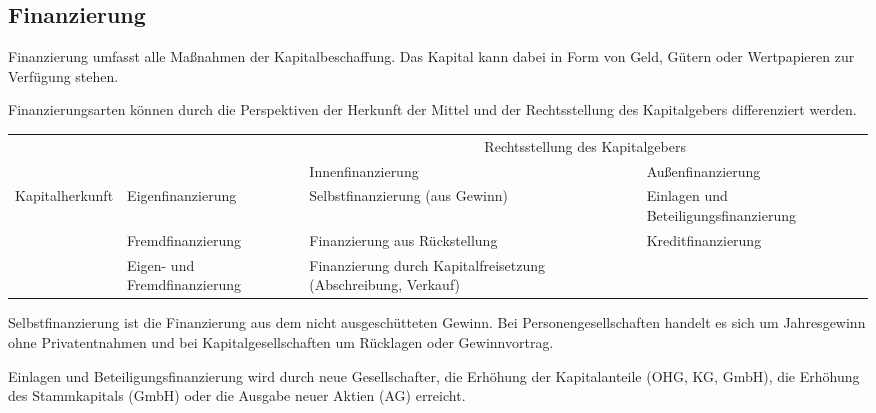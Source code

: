 \subsection{Finanzierung}

Finanzierung umfasst alle Maßnahmen der Kapitalbeschaffung. Das Kapital kann dabei in Form von Geld, Gütern oder Wertpapieren zur Verfügung stehen.

Finanzierungsarten können durch die Perspektiven der Herkunft der Mittel und der Rechtsstellung des Kapitalgebers differenziert werden.

\begin{table}
    [H]
    \centering
    \begin{tabularx}{\textwidth}{|l|X|X|X|}
        \cline{3-4}
        \multicolumn{2}{c|}{}            & \multicolumn{2}{c|}{Rechtsstellung des Kapitalgebers}                                                                                                         \\
        \cline{3-4}
        \multicolumn{2}{c|}{}            & Innenfinanzierung                                     & Außenfinanzierung                                                                                     \\
        \hline
        \multirow{3}{*}{Kapitalherkunft} & Eigenfinanzierung                                     & Selbstfinanzierung (aus Gewinn)                               & Einlagen und Beteiligungsfinanzierung \\
        \cline{2-4}
                                         & Fremdfinanzierung                                     & Finanzierung aus Rückstellung                                 & Kreditfinanzierung                    \\
        \cline{2-4}
                                         & Eigen- und Fremdfinanzierung                          & Finanzierung durch Kapitalfreisetzung (Abschreibung, Verkauf) & \multicolumn{1}{c}{}                  \\
        \cline{1-3}
    \end{tabularx}
\end{table}

Selbstfinanzierung ist die Finanzierung aus dem nicht ausgeschütteten Gewinn. Bei Personengesellschaften handelt es sich um Jahresgewinn ohne Privatentnahmen und bei Kapitalgesellschaften um Rücklagen oder Gewinnvortrag.

Einlagen und Beteiligungsfinanzierung wird durch neue Gesellschafter, die Erhöhung der Kapitalanteile (OHG, KG, GmbH), die Erhöhung des Stammkapitals (GmbH) oder die Ausgabe neuer Aktien (AG) erreicht.

